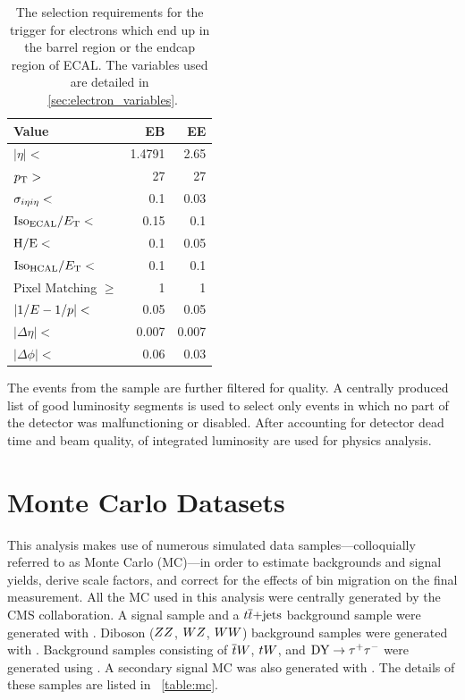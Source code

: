 \begin{table}[h]
\centering
{}
\begin{center}
    \begin{tabular}{@{}l r r@{}}
        \toprule
        Value                      & EB     & EE     \\
        \midrule
        $|\eta| <$                 & 1.4791 & 2.65   \\
        $p_{\mathrm{T}} >$                    & 27     & 27     \\
        $\sigma_{i \eta i \eta} <$         & 0.1    & 0.03   \\
        $\text{Iso}_{\text{ECAL}} / E_{\mathrm{T}} <$         & 0.15   & 0.1    \\
        $\text{H}/\text{E} <$                & 0.1    & 0.05   \\
        $\text{Iso}_{\text{HCAL}} / E_{\mathrm{T}} <$         & 0.1    & 0.1    \\
        Pixel Matching $\ge$       & 1      & 1      \\
        $|1/E - 1/p| <$              & 0.05   & 0.05   \\
        $|\Delta \eta| <$          & 0.007  & 0.007  \\
        $|\Delta \phi| <$          & 0.06   & 0.03   \\
        \bottomrule
    \end{tabular}
\end{center}
\caption[
    The selection requirements for the \SingleElectronTrigger trigger.
]{
    The selection requirements for the \SingleElectronTrigger trigger for
    electrons which end up in the barrel region or the endcap region of ECAL.
    The variables used are detailed in \SEC~\ref{sec:electron_variables}.
}
\label{table:wp80}
\end{table}

The events from the \SingleElectron sample are further filtered for quality. A
centrally produced list of good luminosity segments is used to select only
events in which no part of the detector was malfunctioning or disabled. After
accounting for detector dead time and beam quality, \GoodLumiNumber of
integrated luminosity are used for physics analysis.

\section{Monte Carlo Datasets}
\label{ssec:monte_carlo}

This analysis makes use of numerous simulated data samples---colloquially
referred to as Monte Carlo (MC)---in order to estimate backgrounds and signal
yields, derive scale factors, and correct for the effects of bin migration on
the final measurement. All the MC used in this analysis were centrally
generated by the CMS collaboration. A \DYtoll signal sample and a
$t\overline{t}\text{+jets}$ background sample were generated with \MADGRAPH
\cite{alwall2014}. Diboson ($ZZ$, $WZ$, $WW$) background samples were
generated with \PYTHIA \cite{sjostran2006}. Background samples consisting of
$\overline{t} W$, $t W$, and $\text{DY} \to \tau^{+} \tau^{-}$ were generated using \POWHEG
\cite{nason2004}\cite{alioli2010}\cite{re2011}. A secondary signal MC was also
generated with \POWHEG. The details of these samples are listed in
\TAB~\ref{table:mc}.

